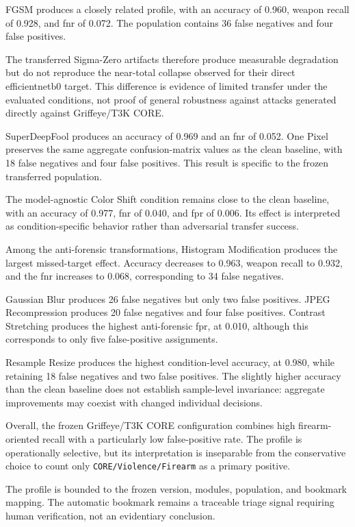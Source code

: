 FGSM produces a closely related profile, with an accuracy of 0.960, weapon
recall of 0.928, and \gls{fnr} of 0.072. The population contains 36 false
negatives and four false positives.

The transferred Sigma-Zero artifacts therefore produce measurable degradation
but do not reproduce the near-total collapse observed for their direct
\gls{efficientnetb0} target. This difference is evidence of limited transfer under
the evaluated conditions, not proof of general robustness against attacks
generated directly against Griffeye/T3K CORE.

SuperDeepFool produces an accuracy of 0.969 and an \gls{fnr} of 0.052.
One Pixel preserves the same aggregate confusion-matrix values as the clean
baseline, with 18 false negatives and four false positives. This result is
specific to the frozen transferred population.

The model-agnostic Color Shift condition remains close to the clean baseline,
with an accuracy of 0.977, \gls{fnr} of 0.040, and \gls{fpr} of 0.006. Its
effect is interpreted as condition-specific behavior rather than adversarial
transfer success.

Among the anti-forensic transformations, Histogram Modification produces the
largest missed-target effect. Accuracy decreases to 0.963, weapon recall to
0.932, and the \gls{fnr} increases to 0.068, corresponding to 34 false
negatives.

Gaussian Blur produces 26 false negatives but only two false positives.
JPEG Recompression produces 20 false negatives and four false positives.
Contrast Stretching produces the highest anti-forensic \gls{fpr}, at 0.010,
although this corresponds to only five false-positive assignments.

Resample Resize produces the highest condition-level accuracy, at 0.980, while
retaining 18 false negatives and two false positives. The slightly higher
accuracy than the clean baseline does not establish sample-level invariance:
aggregate improvements may coexist with changed individual decisions.

Overall, the frozen Griffeye/T3K CORE configuration combines high
firearm-oriented recall with a particularly low false-positive rate. The
profile is operationally selective, but its interpretation is inseparable from
the conservative choice to count only
\texttt{CORE/Violence/Firearm} as a primary positive.

The profile is bounded to the frozen version, modules, population, and bookmark
mapping. The automatic bookmark remains a traceable triage signal requiring
human verification, not an evidentiary conclusion.

